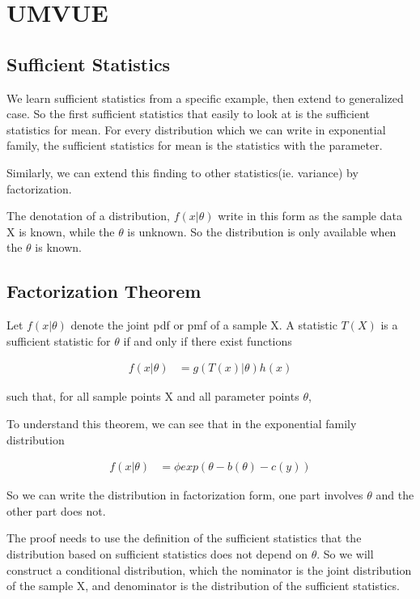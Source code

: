\section{UMVUE}

\subsection{Sufficient Statistics}
We learn sufficient statistics from a specific example, then extend to generalized case. So the first sufficient statistics that easily to look at is the sufficient statistics for mean. For every distribution which we can write in exponential family, the sufficient statistics for mean is the statistics with the parameter. 

Similarly, we can extend this finding to other statistics(ie. variance) by factorization.

The denotation of a distribution, $f(x | \theta)$ write in this form as the sample data X is known, while the $\theta$ is unknown. So the distribution is only available when the $\theta$ is known. 

\subsection{Factorization Theorem}

Let  $f(x | \theta)$ denote the joint pdf or pmf of a sample X. A statistic $T(X)$ is a sufficient statistic for $\theta$ if and only if there exist functions  

\begin{align*}
	f(x | \theta) &=g(T(x)| \theta) h(x)
\end{align*}

such that, for all sample points X and all parameter points  $\theta$,


To understand this theorem, we can see that in the exponential family distribution

\begin{align*}
	f(x | \theta) &= \phi exp( \theta - b(\theta) - c(y))
\end{align*}

So we can write the distribution in factorization form, one part involves $\theta$ and the other part does not.


The proof needs to use the definition of the sufficient statistics that the distribution based on sufficient statistics does not depend on $\theta$. So we will construct a conditional distribution, which the nominator is the joint distribution of the sample X, and denominator is the distribution of the sufficient statistics.

